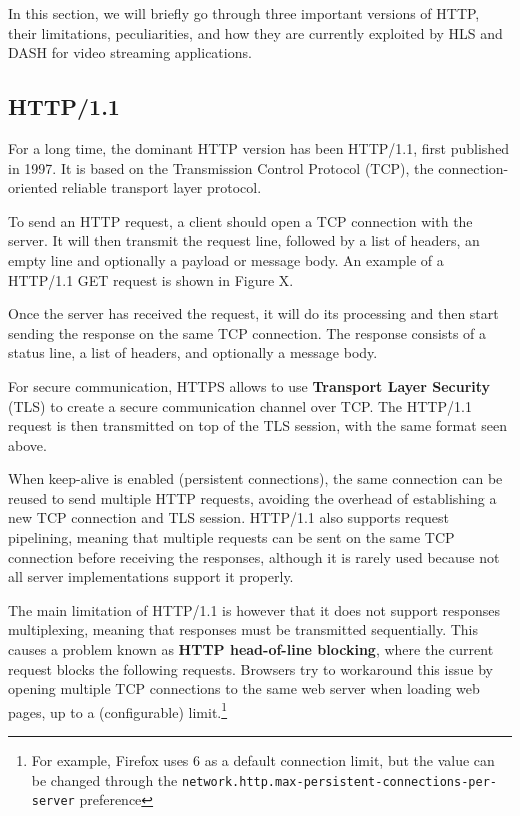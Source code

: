 In this section, we will briefly go through three important versions of HTTP, their limitations, peculiarities, and how they are currently exploited by HLS and DASH for video streaming applications.

\subsection{HTTP/1.1}
\label{sec:bg/http1}

For a long time, the dominant HTTP version has been HTTP/1.1, first published in 1997.\cite{http1.1} It is based on the Transmission Control Protocol (TCP), the connection-oriented reliable transport layer protocol.

To send an HTTP request, a client should open a TCP connection with the server. It will then transmit the request line, followed by a list of headers, an empty line and optionally a payload or message body. An example of a HTTP/1.1 GET request is shown in Figure X.


Once the server has received the request, it will do its processing and then start sending the response on the same TCP connection. The response consists of a status line, a list of headers, and optionally a message body.

For secure communication, HTTPS allows to use \textbf{Transport Layer Security} (TLS) to create a secure communication channel over TCP. The HTTP/1.1 request is then transmitted on top of the TLS session, with the same format seen above.

When keep-alive is enabled (persistent connections), the same connection can be reused to send multiple HTTP requests, avoiding the overhead of establishing a new TCP connection and TLS session. HTTP/1.1 also supports request pipelining, meaning that multiple requests can be sent on the same TCP connection before receiving the responses, although it is rarely used because not all server implementations support it properly.

The main limitation of HTTP/1.1 is however that it does not support responses multiplexing, meaning that responses must be transmitted sequentially. This causes a problem known as \textbf{HTTP head-of-line blocking}, where the current request blocks the following requests. Browsers try to workaround this issue by opening multiple TCP connections to the same web server when loading web pages, up to a (configurable) limit.\footnote{For example, Firefox uses 6 as a default connection limit, but the value can be changed through the \texttt{network.http.max-persistent-connections-per-server} preference} 

